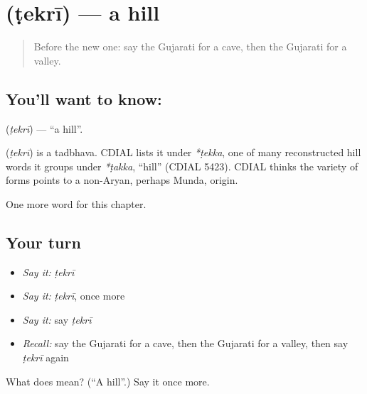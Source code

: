 \section[\texorpdfstring{\gu{ટેકરી} (ṭekrī)}{ટેકરી (ṭekrī)}]{ (ṭekrī) — a hill}

\label{lesson:GU-C119-tekri}



\begin{quote}
Before the new one: say the Gujarati for a cave, then the Gujarati for a valley.
\end{quote}

\subsection*{You'll want to know: }
\textbf{} (\emph{ṭekrī}) — \textquotedblleft{}a hill\textquotedblright{}.

\begin{cousinweb}
\textbf{} (\emph{ṭekrī}) is a tadbhava. CDIAL lists it under \emph{*ṭekka}, one of many reconstructed hill words it groups under \emph{*ṭakka}, \textquotedblleft{}hill\textquotedblright{} (CDIAL 5423). CDIAL thinks the variety of forms points to a non-Aryan, perhaps Munda, origin.
\end{cousinweb}

\begin{grammarlens}[title={What you've built}]
One more word for this chapter.
\end{grammarlens}

\subsection*{Your turn}
\begin{itemize}
\raggedright
  \item \emph{Say it:} \emph{ṭekrī}
  \item \emph{Say it:} \emph{ṭekrī}, once more
  \item \emph{Say it:} say \emph{ṭekrī}
  \item \emph{Recall:} say the Gujarati for a cave, then the Gujarati for a valley, then say \emph{ṭekrī} again
\end{itemize}

\begin{tcolorbox}[breakable,colback=teal!4,colframe=teal!35!black,title={Before you move on}]
What does  mean? (\textquotedblleft{}A hill\textquotedblright{}.) Say it once more.
\end{tcolorbox}

